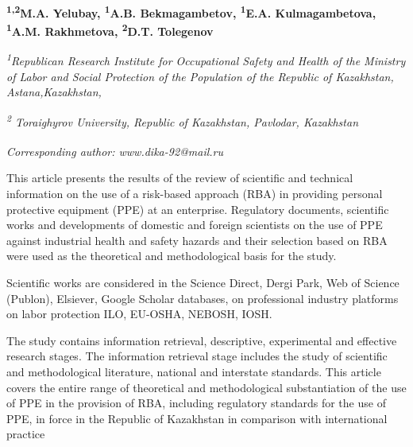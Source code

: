 
\begin{articleheader}

{\bfseries \textsuperscript{1,2}M.A. Yelubay,
\textsuperscript{1}A.B. Bekmagambetov,
\textsuperscript{1}E.A. Kulmagambetova,
\textsuperscript{1}A.M. Rakhmetova, 
\textsuperscript{2}D.T. Tolegenov\textsuperscript{\envelope } }
\end{articleheader}

\begin{affiliation}
\emph{\textsuperscript{1}Republican Research Institute for Occupational Safety and Health of the
Ministry of Labor and Social Protection of the Population of the Republic of Kazakhstan, Astana,Kazakhstan,}

\emph{\textsuperscript{2} Toraighyrov University, Republic of Kazakhstan, Pavlodar, Kazakhstan}

\raggedright \textsuperscript{\envelope }{\em Corresponding author: www.dika-92@mail.ru}
\end{affiliation}

This article presents the results of the review of scientific and
technical information on the use of a risk-based approach (RBA) in
providing personal protective equipment (PPE) at an enterprise.
Regulatory documents, scientific works and developments of domestic and
foreign scientists on the use of PPE against industrial health and
safety hazards and their selection based on RBA were used as the
theoretical and methodological basis for the study.

Scientific works are considered in the Science Direct, Dergi Park, Web
of Science (Publon), Elsiever, Google Scholar databases, on professional
industry platforms on labor protection ILO, EU-OSHA, NEBOSH, IOSH.

The study contains information retrieval, descriptive, experimental and
effective research stages. The information retrieval stage includes the
study of scientific and methodological literature, national and
interstate standards. This article covers the entire range of
theoretical and methodological substantiation of the use of PPE in the
provision of RBA, including regulatory standards for the use of PPE, in
force in the Republic of Kazakhstan in comparison with international
practice

